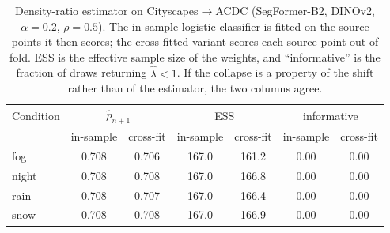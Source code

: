 \begin{table}[t]
\centering
\caption{Density-ratio estimator on Cityscapes$\to$ACDC (SegFormer-B2, DINOv2, $\alpha=0.2$, $\rho=0.5$). The in-sample logistic classifier is fitted on the source points it then scores; the cross-fitted variant scores each source point out of fold. ESS is the effective sample size of the weights, and ``informative'' is the fraction of draws returning $\hat{\lambda} < 1$. If the collapse is a property of the shift rather than of the estimator, the two columns agree.}
\label{tab:tierb_estimator}
\footnotesize
\setlength{\tabcolsep}{3pt}
\begin{tabular}{lcccccc}
\toprule
Condition & \multicolumn{2}{c}{$\hat{p}_{n+1}$} & \multicolumn{2}{c}{ESS} & \multicolumn{2}{c}{informative} \\
 & in-sample & cross-fit & in-sample & cross-fit & in-sample & cross-fit \\
\midrule
fog & 0.708 & 0.706 & 167.0 & 161.2 & 0.00 & 0.00 \\
night & 0.708 & 0.708 & 167.0 & 166.8 & 0.00 & 0.00 \\
rain & 0.708 & 0.707 & 167.0 & 166.4 & 0.00 & 0.00 \\
snow & 0.708 & 0.708 & 167.0 & 166.9 & 0.00 & 0.00 \\
\bottomrule
\end{tabular}
\end{table}
